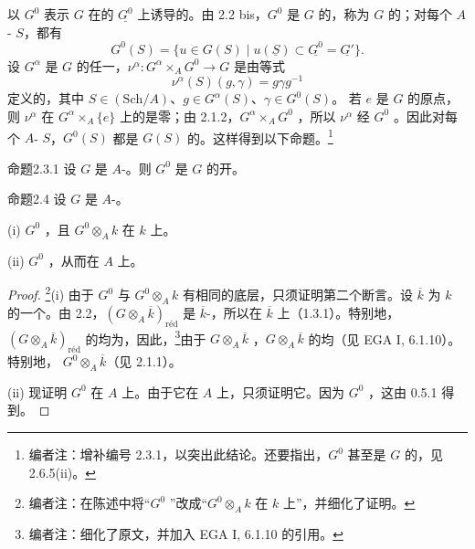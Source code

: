 以 $G^0$ 表示 $G$ 在的 $\underline{G^0}$ 上诱导的。由 2.2 bis，$G^0$ 是 $G$ 的，称为 $G$ 的；对每个 $A$- $S$，都有
\[
G^0(S)=\{u\in G(S)\mid u(\underline S)\subset\underline{G^0}=\underline{G'}\}.
\]
设 $G^\alpha$ 是 $G$ 的任一，$\nu^\alpha:G^\alpha\times_A G^0\to G$ 是由等式
\[
\nu^\alpha(S)(g,\gamma)=g\gamma g^{-1}
\]
定义的，其中 $S\in(\mathrm{Sch}/A)$、$g\in G^\alpha(S)$、$\gamma\in G^0(S)$。
若 $e$ 是 $G$ 的原点，则 $\nu^\alpha$ 在 $G^\alpha\times_A\{e\}$ 上的是零；由 2.1.2，$G^\alpha\times_A G^0$ ，所以 $\nu^\alpha$ 经 $G^0$ 。因此对每个 $A$- $S$，$G^0(S)$ 都是 $G(S)$ 的。这样得到以下命题。\footnote{编者注：增补编号 2.3.1，以突出此结论。还要指出，$G^0$ 甚至是 $G$ 的，见 2.6.5(ii)。}
\begin{SGAresult}{命题}{2.3.1}
设 $G$ 是 $A$-。则 $G^0$ 是 $G$ 的开。
\end{SGAresult}
\begin{SGAresult}{命题}{2.4}
设 $G$ 是 $A$-。

(i) $G^0$ ，且 $G^0\otimes_A k$ 在 $k$ 上。

(ii) $G^0$ ，从而在 $A$ 上。
\end{SGAresult}
\begin{proof}
\footnote{编者注：在陈述中将“$G^0$ ”改成“$G^0\otimes_A k$ 在 $k$ 上”，并细化了证明。}(i) 由于 $G^0$ 与 $G^0\otimes_A k$ 有相同的底层，只须证明第二个断言。设 $\overline k$ 为 $k$ 的一个。由 2.2，$(G\otimes_A\overline k)_{\mathrm{r\text{é}d}}$ 是 $\overline k$-，所以在 $\overline k$ 上（1.3.1）。特别地，$(G\otimes_A\overline k)_{\mathrm{r\text{é}d}}$ 的均为，因此，\footnote{编者注：细化了原文，并加入 EGA I, 6.1.10 的引用。}由于 $G\otimes_A\overline k$ ，$G\otimes_A\overline k$ 的均（见 EGA I, 6.1.10）。特别地， $G^0\otimes_A\overline k$（见 2.1.1）。

(ii) 现证明 $G^0$ 在 $A$ 上。由于它在 $A$ 上，只须证明它。因为 $G^0$ ，这由 0.5.1 得到。
\end{proof}
